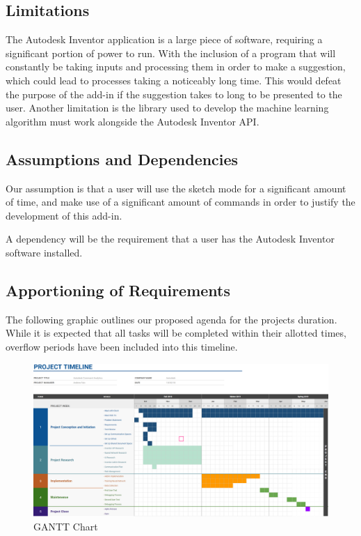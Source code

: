 \documentclass[onecolumn, draftclsnofoot,10pt, compsoc]{IEEEtran}
\begin{document}
\subsection{Limitations}The Autodesk Inventor application is a large piece of software, requiring a significant portion of power to run. With the inclusion of a program that will constantly be taking inputs and processing them in order to make a suggestion, which could lead to processes taking a noticeably long time. This would defeat the purpose of the add-in if the suggestion takes to long to be presented to the user. Another limitation is the library used to develop the machine learning algorithm must work alongside the Autodesk Inventor API. 

\subsection{Assumptions and Dependencies}
Our assumption is that a user will use the sketch mode for a significant amount of time, and make use of a significant amount of commands in order to justify the development of this add-in. 

A dependency will be the requirement that a user has the Autodesk Inventor software installed. 

\subsection{Apportioning of Requirements}
The following graphic outlines our proposed agenda for the projects duration.  While it is expected that all tasks will be completed within their allotted times, overflow periods have been included into this timeline.
\newline
    \begin{figure}[H]
        \centering
         \includegraphics[scale=0.22]{GANTT_0.png}
        \caption{GANTT Chart}
        \label{fig:2}
    \end{figure}
\end{document}
